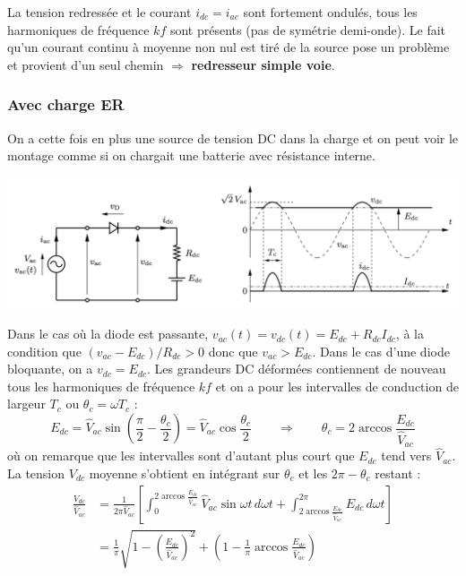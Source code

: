 				La tension redressée et le courant $i_{dc}=i_{ac}$ sont fortement ondulés, tous les harmoniques de fréquence $kf$ sont présents (pas de symétrie demi-onde). Le fait qu'un courant continu à moyenne non nul est tiré de la source pose un problème et provient d'un seul chemin $\Rightarrow$ \textbf{redresseur simple voie}. 
				
			\subsubsection{Avec charge ER}
				On a cette fois en plus une source de tension DC dans la charge et on peut voir le montage comme si on chargait une batterie avec résistance interne. 
				
				\begin{center}
				\includegraphics[scale=0.45]{ch2/4}
				\end{center}			 
				
				Dans le cas où la diode est passante, $v_{ac}(t) = v_{dc}(t) = E_{dc} + R_{dc}I_{dc}$, à la condition que $(v_{ac}-E_{dc})/R_{dc}>0$ donc que $v_{ac}>E_{dc}$. Dans le cas d'une diode bloquante, on a $v_{dc} = E_{dc}$. Les grandeurs DC déformées contiennent de nouveau tous les harmoniques de fréquence $kf$ et on a pour les intervalles de conduction de largeur $T_c$ ou $\theta _c = \omega T_c$ : 
				\begin{equation}
					E_{dc} = \hat{V}_{ac} \sin \left(\frac{\pi}{2} - \frac{\theta _c}{2}\right) = \hat{V}_{ac} \cos \frac{\theta _c}{2} \qquad \Rightarrow \qquad \theta _c = 2 \arccos \frac{E_{dc}}{\hat{V}_{ac}}
				\end{equation}
				où on remarque que les intervalles sont d'autant plus court que $E_{dc}$ tend vers $\hat{V}_{ac}$. La tension $V_{dc}$ moyenne s'obtient en intégrant sur $\theta _c$ et les $2\pi - \theta _c$ restant : 
				\begin{equation}
				\begin{aligned}
					\frac{V_{dc}}{\hat{V}_{ac}} &= \frac{1}{2\pi\hat{V}_{ac}} \left[ \int _0 ^{2 \arccos \frac{E_{dc}}{\hat{V}_{ac}}} \hat{V}_{ac} \sin \omega t\,  d\omega t + \int _{2 \arccos \frac{E_{dc}}{\hat{V}_{ac}}} ^{2\pi} E_{dc} \, d\omega t \right]\\
								&= \frac{1}{\pi} \sqrt{1 - \left(\frac{E_{dc}}{\hat{V}_{ac}}\right)^2} + \left(1- \frac{1}{\pi} \arccos \frac{E_{dc}}{\hat{V}_{ac}} \right)
				\end{aligned}
				\end{equation}
				
